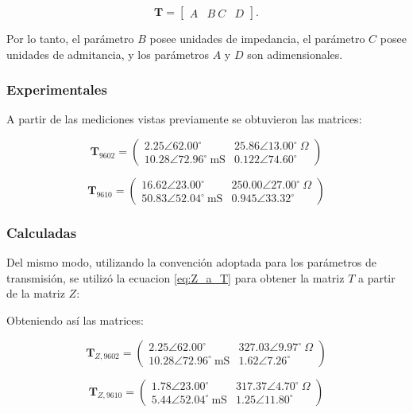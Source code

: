 \begin{equation}
\mathbf{T}=
\begin{bmatrix}
A & B\
C & D
\end{bmatrix}.
\end{equation}

Por lo tanto, el parámetro $B$ posee unidades de impedancia, el parámetro $C$ posee unidades de admitancia, y los parámetros $A$ y $D$ son adimensionales.

\subsubsection{Experimentales}

A partir de las mediciones vistas previamente se obtuvieron las matrices:

\[
\mathbf{T}_{9602} =
\begin{pmatrix}
2.25 \angle 62.00^\circ & 25.86 \angle 13.00^\circ \ \Omega \\
10.28 \angle 72.96^\circ \ \mathrm{mS} & 0.122 \angle 74.60^\circ
\end{pmatrix}
\]

\[
\mathbf{T}_{9610} =
\begin{pmatrix}
16.62 \angle 23.00^\circ & 250.00 \angle 27.00^\circ \ \Omega \\
50.83 \angle 52.04^\circ \ \mathrm{mS} & 0.945 \angle 33.32^\circ
\end{pmatrix}
\]

\subsubsection{Calculadas}

Del mismo modo, utilizando la convención adoptada para los parámetros de transmisión, se utilizó la ecuacion \ref{eq:Z_a_T} para obtener la matriz $T$ a partir de la matriz $Z$:

Obteniendo así las matrices:

\[
\mathbf{T}_{Z,9602} =
\begin{pmatrix}
2.25 \angle 62.00^\circ & 327.03 \angle 9.97^\circ \ \Omega \\
10.28 \angle 72.96^\circ \ \mathrm{mS} & 1.62 \angle 7.26^\circ
\end{pmatrix}
\]

\[
\mathbf{T}_{Z,9610} =
\begin{pmatrix}
1.78 \angle 23.00^\circ & 317.37 \angle 4.70^\circ \ \Omega \\
5.44 \angle 52.04^\circ \ \mathrm{mS} & 1.25 \angle 11.80^\circ
\end{pmatrix}
\]

